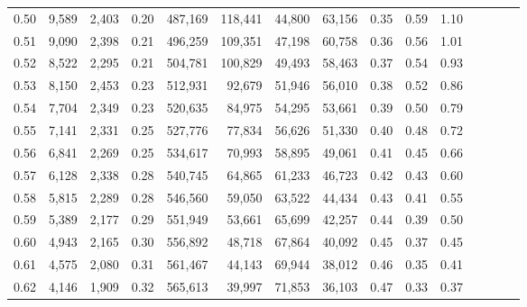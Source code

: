 \begin{tabular}{rrrcrrrrrrrrrrr}
0.50 &   9,589 &  2,403 &                                       0.20 &  487,169 &  118,441 &   44,800 &   63,156 &  0.35 &  0.59 &                         1.10 \\
0.51 &   9,090 &  2,398 &                                       0.21 &  496,259 &  109,351 &   47,198 &   60,758 &  0.36 &  0.56 &                         1.01 \\
0.52 &   8,522 &  2,295 &                                       0.21 &  504,781 &  100,829 &   49,493 &   58,463 &  0.37 &  0.54 &                         0.93 \\
0.53 &   8,150 &  2,453 &                                       0.23 &  512,931 &   92,679 &   51,946 &   56,010 &  0.38 &  0.52 &                         0.86 \\
0.54 &   7,704 &  2,349 &                                       0.23 &  520,635 &   84,975 &   54,295 &   53,661 &  0.39 &  0.50 &                         0.79 \\
0.55 &   7,141 &  2,331 &                                       0.25 &  527,776 &   77,834 &   56,626 &   51,330 &  0.40 &  0.48 &                         0.72 \\
0.56 &   6,841 &  2,269 &                                       0.25 &  534,617 &   70,993 &   58,895 &   49,061 &  0.41 &  0.45 &                         0.66 \\
0.57 &   6,128 &  2,338 &                                       0.28 &  540,745 &   64,865 &   61,233 &   46,723 &  0.42 &  0.43 &                         0.60 \\
0.58 &   5,815 &  2,289 &                                       0.28 &  546,560 &   59,050 &   63,522 &   44,434 &  0.43 &  0.41 &                         0.55 \\
0.59 &   5,389 &  2,177 &                                       0.29 &  551,949 &   53,661 &   65,699 &   42,257 &  0.44 &  0.39 &                         0.50 \\
0.60 &   4,943 &  2,165 &                                       0.30 &  556,892 &   48,718 &   67,864 &   40,092 &  0.45 &  0.37 &                         0.45 \\
0.61 &   4,575 &  2,080 &                                       0.31 &  561,467 &   44,143 &   69,944 &   38,012 &  0.46 &  0.35 &                         0.41 \\
0.62 &   4,146 &  1,909 &                                       0.32 &  565,613 &   39,997 &   71,853 &   36,103 &  0.47 &  0.33 &                         0.37 \\

\end{tabular}
